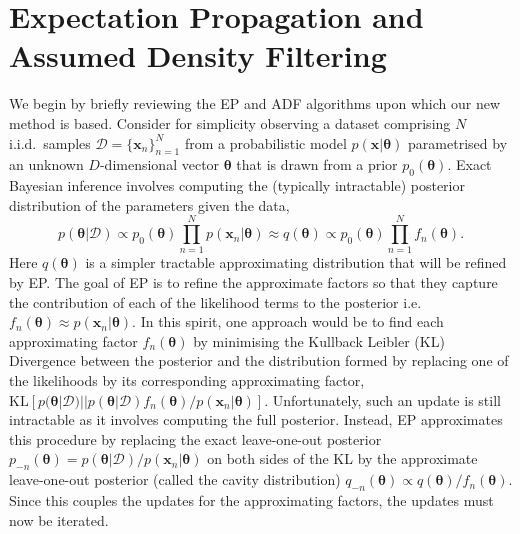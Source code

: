 

\section{Expectation Propagation and Assumed Density Filtering}
We begin by briefly reviewing the EP and ADF algorithms upon which our new method is based. Consider for simplicity observing a dataset comprising $N$ i.i.d.~samples $\mathcal{D} = \{\bm{x}_n \}_{n=1}^N$ from a probabilistic model $p(\bm{x}|\bm{\theta})$ parametrised by an unknown $D$-dimensional vector $\bm{\theta}$ that is drawn from a prior $p_0(\bm{\theta})$. Exact Bayesian inference involves computing the (typically intractable) posterior distribution of the parameters given the data, 
\begin{equation}
p(\bm{\theta} | \mathcal{D}) \propto p_0(\bm{\theta}) \prod_{n=1}^{N} p(\bm{x}_n | \bm{\theta}) \approx q(\bm{\theta}) \propto p_0(\bm{\theta}) \prod_{n=1}^{N} f_n(\bm{\theta}).
\end{equation}
%
Here $q(\bm{\theta})$  is a simpler tractable approximating distribution that will be refined by EP.
%
%
%
The goal of EP is to refine the approximate factors so that they capture the contribution of each of the likelihood terms to the posterior i.e.~$f_n(\bm{\theta}) \approx p(\bm{x}_n | \bm{\theta})$. In this spirit, one approach would be to find each approximating factor $f_n(\bm{\theta})$ by minimising the Kullback Leibler (KL) Divergence between the posterior and the distribution formed by replacing one of the likelihoods by its corresponding approximating factor,  $\mathrm{KL}[p(\bm{\theta}|\mathcal{D}) || p(\bm{\theta}|\mathcal{D}) f_n(\bm{\theta})/ p(\bm{x}_n | \bm{\theta})]$. Unfortunately, such an update is still intractable as it involves computing the full posterior. Instead, EP approximates this procedure by replacing the exact leave-one-out posterior $p_{-n}(\bm{\theta}) = p(\bm{\theta}|\mathcal{D}) / p(\bm{x}_n | \bm{\theta})$ on both sides of the KL by the approximate leave-one-out posterior (called the cavity distribution) $q_{-n}(\bm{\theta}) \propto q(\bm{\theta})/f_n(\bm{\theta})$. Since this couples the updates for the approximating factors, the updates must now be iterated.

